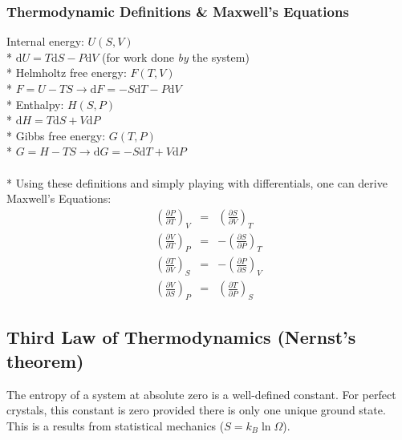 \subsubsection{Thermodynamic Definitions \& Maxwell's Equations}
Internal energy: \(U(S,V)\)\\*
\(\mathrm{d}U=T\mathrm{d}S-P\mathrm{d}V\) (for work done \emph{by} the system)\\*
Helmholtz free energy: \(F(T,V)\)\\*
\(F=U-TS\rightarrow\mathrm{d}F=-S\mathrm{d}T-P\mathrm{d}V\)\\*
Enthalpy: \(H(S,P)\)\\*
\(\mathrm{d}H=T\mathrm{d}S+V\mathrm{d}P\)\\*
Gibbs free energy: \(G(T,P)\)\\*
\(G=H-TS\rightarrow\mathrm{d}G=-S\mathrm{d}T+V\mathrm{d}P\)\\\\*
Using these definitions and simply playing with differentials, one can derive Maxwell's Equations:
\begin{eqnarray}
\displaystyle \left(\frac{\partial P}{\partial T}\right)_V&=&\left(\frac{\partial S}{\partial V}\right)_T \nonumber\\
\displaystyle \left(\frac{\partial V}{\partial T}\right)_P&=&-\left(\frac{\partial S}{\partial P}\right)_T \nonumber\\
\displaystyle \left(\frac{\partial T}{\partial V}\right)_S&=&-\left(\frac{\partial P}{\partial S}\right)_V \nonumber\\
\displaystyle \left(\frac{\partial V}{\partial S}\right)_P&=&\left(\frac{\partial T}{\partial P}\right)_S \nonumber
\end{eqnarray}

\subsection{Third Law of Thermodynamics (Nernst's theorem)}
The entropy of a system at absolute zero is a well-defined constant.
For perfect crystals, this constant is zero provided there is only one unique ground state.
This is a results from statistical mechanics (\(\displaystyle S=k_{B}\ln\Omega\)).
